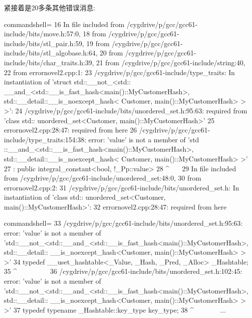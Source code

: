 紧接着是20多条其他错误消息:

{\scriptsize
\begin{tcblisting}{commandshell={}}
16 In file included from /cygdrive/p/gcc/gcc61-include/bits/move.h:57:0,
18                  from /cygdrive/p/gcc/gcc61-include/bits/stl_pair.h:59,
19                  from /cygdrive/p/gcc/gcc61-include/bits/stl_algobase.h:64,
20 from /cygdrive/p/gcc/gcc61-include/bits/char_traits.h:39,
21                  from /cygdrive/p/gcc/gcc61-include/string:40,
22                  from errornovel2.cpp:1:
23 /cygdrive/p/gcc/gcc61-include/type_traits: In instantiation of ’struct std::__not_<std::
   __and_<std::__is_fast_hash<main()::MyCustomerHash>, std::__detail::__is_noexcept_hash<
   Customer, main()::MyCustomerHash> > >’:
24 /cygdrive/p/gcc/gcc61-include/bits/unordered_set.h:95:63: required from ’class std::
   unordered_set<Customer, main()::MyCustomerHash>’
25 errornovel2.cpp:28:47: required from here
26 /cygdrive/p/gcc/gcc61-include/type_traits:154:38: error: ’value’ is not a member of ’std
   ::__and_<std::__is_fast_hash<main()::MyCustomerHash>, std::__detail::__is_noexcept_hash<
   Customer, main()::MyCustomerHash> >’
27      : public integral_constant<bool, !_Pp::value>
28                                                  ^~~~
29 In file included from /cygdrive/p/gcc/gcc61-include/unordered_set:48:0,
30                  from errornovel2.cpp:2:
31 /cygdrive/p/gcc/gcc61-include/bits/unordered_set.h: In instantiation of ’class std::
   unordered_set<Customer, main()::MyCustomerHash>’:
32 errornovel2.cpp:28:47: required from here
\end{tcblisting}
}
{\scriptsize
\begin{tcblisting}{commandshell={}}
33 /cygdrive/p/gcc/gcc61-include/bits/unordered_set.h:95:63: error: ’value’ is not a member
   of ’std::__not_<std::__and_<std::__is_fast_hash<main()::MyCustomerHash>, std::__detail::
   __is_noexcept_hash<Customer, main()::MyCustomerHash> > >’
34        typedef __uset_hashtable<_Value, _Hash, _Pred, _Alloc> _Hashtable;
35                                                                                  ^~~~~~~~~~
36 /cygdrive/p/gcc/gcc61-include/bits/unordered_set.h:102:45: error: ’value’ is not a member
   of ’std::__not_<std::__and_<std::__is_fast_hash<main()::MyCustomerHash>, std::__detail::
   __is_noexcept_hash<Customer, main()::MyCustomerHash> > >’
37 typedef typename _Hashtable::key_type key_type;
38                                                     ^~~~~~~~
...
\end{tcblisting}
}

